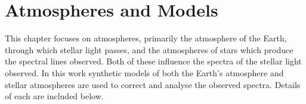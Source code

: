 
\chapter{Atmospheres and Models}
\label{cha:atmospheres_and_models}

This chapter focuses on atmospheres, primarily the atmosphere of the Earth, through which stellar light passes, and the atmospheres of stars which produce the spectral lines observed.
Both of these influence the spectra of the stellar light observed.
In this work synthetic models of both the Earth's atmosphere and stellar atmospheres are used to correct and analyse the observed spectra.
Details of each are included below.








